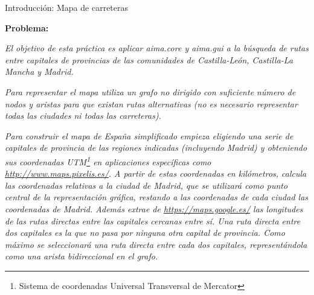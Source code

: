 \documentclass[11pt, a4paper, spanish, openright, twoside]{book}
\begin{document}
\begin{section}{Introducción: Mapa de carreteras}

	\textbf{Problema:} 
	
	\textit{El objetivo de esta práctica es aplicar aima.core y aima.gui a la búsqueda de rutas entre capitales de provincias de las comunidades de Castilla-León, Castilla-La Mancha y Madrid.}
	
	\textit{Para representar el mapa utiliza un grafo no dirigido con suficiente número de nodos y aristas para que existan rutas alternativas (no es necesario representar todas las ciudades ni todas las carreteras).}
	
	\textit{Para construir el mapa de España simplificado empieza eligiendo una serie de capitales de provincia de las regiones indicadas (incluyendo Madrid) y obteniendo sus coordenadas UTM\footnote{Sistema de coordenadas Universal Transversal de Mercator} en aplicaciones específicas como \url{http://www.maps.pixelis.es/}. A partir de estas coordenadas en kilómetros, calcula las coordenadas relativas a la ciudad de Madrid, que se utilizará como punto central de la representación gráfica, restando a las coordenadas de cada ciudad las coordenadas de Madrid. Además extrae de \url{https://maps.google.es/} las longitudes de las rutas directas entre las capitales cercanas entre sí. Una ruta directa entre dos capitales es la que no pasa por ninguna otra capital de provincia. Como máximo se seleccionará una ruta directa entre cada dos capitales, representándola como una arista bidireccional en el grafo.}


\end{section}
\end{document}
